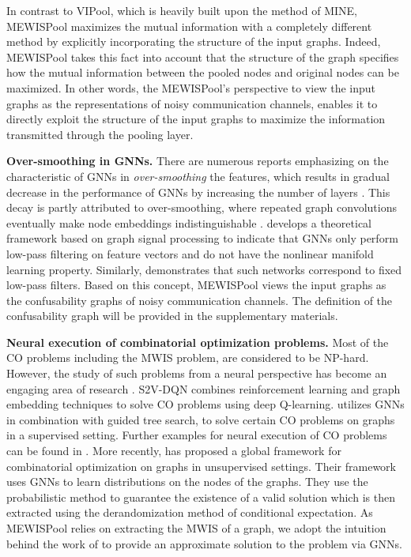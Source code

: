 \documentclass{article}
\begin{document}
In contrast to VIPool, which is heavily built upon the method of MINE, MEWISPool maximizes the mutual information with a completely different method by explicitly incorporating the structure of the input graphs. Indeed, MEWISPool takes this fact into account that the structure of the graph specifies how the mutual information between the pooled nodes and original nodes can be maximized. In other words, the MEWISPool's perspective to view the input graphs as the representations of noisy communication channels, enables it to directly exploit the structure of the input graphs to maximize the information transmitted through the pooling layer.

\textbf{Over-smoothing in GNNs.}
There are numerous reports emphasizing on the characteristic of GNNs in \textit{over-smoothing} the features, which results in gradual decrease in the performance of GNNs by increasing the number of layers \cite{oversmoothing, oversmoothing2}. This decay is partly attributed to over-smoothing, where repeated graph convolutions eventually make node embeddings indistinguishable \cite{pairnorm}.
\cite{lowpass} develops a theoretical framework based on graph signal processing to indicate that GNNs only perform low-pass filtering on feature vectors and do not have the nonlinear manifold learning property. Similarly, \cite{fastgcn} demonstrates that such networks correspond to fixed low-pass filters. Based on this concept, MEWISPool views the input graphs as the confusability graphs of noisy communication channels. The definition of the confusability graph will be provided in the supplementary materials.

\textbf{Neural execution of combinatorial optimization problems.}
Most of the CO problems including the MWIS problem, are considered to be NP-hard. However, the study of such problems from a neural perspective has become an engaging area of research \cite{co3, co4, co6, co5, co1, co2}. S2V-DQN \cite{dqn} combines reinforcement learning and graph embedding techniques to solve CO problems using deep Q-learning. \cite{guidedtree} utilizes GNNs in combination with guided tree search, to solve certain CO problems on graphs in a supervised setting. Further examples for neural execution of CO problems can be found in \cite{horizon}. More recently, \cite{erdos} has proposed a global framework for combinatorial optimization on graphs in unsupervised settings. Their framework uses GNNs to learn distributions on the nodes of the graphs. They use the probabilistic method to guarantee the existence of a valid solution which is then extracted using the derandomization method of conditional expectation. As MEWISPool relies on extracting the MWIS of a graph, we adopt the intuition behind the work of \cite{erdos} to provide an approximate solution to the problem via GNNs.
\end{document}
